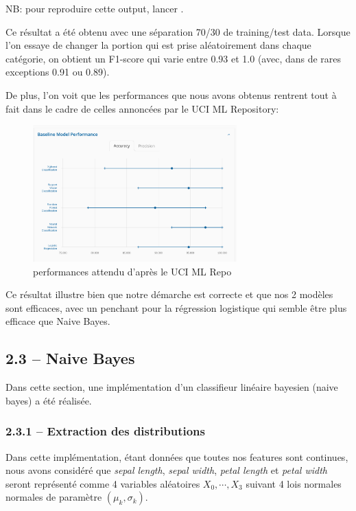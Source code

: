\documentclass[
]{article}
\begin{document}
NB: pour reproduire cette output, lancer .

Ce résultat a été obtenu avec une séparation 70/30 de training/test
data. Lorsque l'on essaye de changer la portion qui est prise
aléatoirement dans chaque catégorie, on obtient un F1-score qui varie
entre 0.93 et 1.0 (avec, dans de rares exceptions 0.91 ou 0.89).

De plus, l'on voit que les performances que nous avons obtenus rentrent
tout à fait dans le cadre de celles annoncées par le UCI ML Repository:

\begin{figure}
\centering
\includegraphics[width=0.7\textwidth,height=\textheight]{../res/screenshot_ucmi_perfs.png}
\caption{performances attendu d'après le UCI ML Repo \cite{IrisWebsite}}
\end{figure}

Ce résultat illustre bien que notre démarche est correcte et que nos 2
modèles sont efficaces, avec un penchant pour la régression logistique
qui semble être plus efficace que Naive Bayes.

\newpage{}

\hypertarget{naive-bayes-1}{%
\subsection{2.3 -- Naive Bayes}\label{naive-bayes-1}}

Dans cette section, une implémentation d'un classifieur linéaire
bayesien (naive bayes) a été réalisée.

\hypertarget{extraction-des-distributions}{%
\subsubsection{2.3.1 -- Extraction des
distributions}\label{extraction-des-distributions}}

Dans cette implémentation, étant données que toutes nos features sont
continues, nous avons considéré que \emph{sepal length}, \emph{sepal
width}, \emph{petal length} et \emph{petal width} seront représenté
comme 4 variables aléatoires \(X_0, \cdots, X_3\) suivant 4 lois
normales normales de paramètre \((\mu_k, \sigma_k)\).
\end{document}
